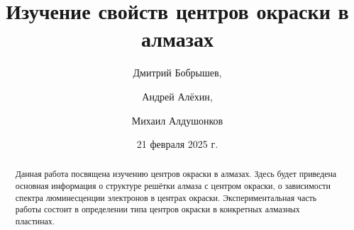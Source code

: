 \title{Изучение свойств центров окраски в алмазах}
\author{Дмитрий Бобрышев,}
\author{Андрей Алёхин,}
\author{Михаил Алдушонков}

\date{21 февраля 2025 г.}

\begin{abstract}
    Данная работа посвящена изучению центров окраски в алмазах. 
    Здесь будет приведена основная информация о структуре решётки алмаза
    с центром окраски, о зависимости 
    спектра люминесценции электронов в центрах окраски. Экспериментальная часть
    работы состоит в определении типа центров окраски в конкретных алмазных 
    пластинах.
\end{abstract}

